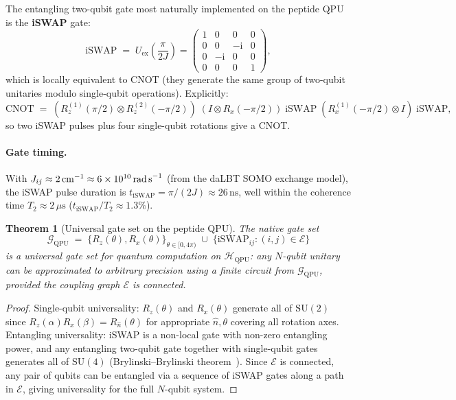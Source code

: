 \documentclass[11pt,oneside]{amsbook}
\numberwithin{equation}{section}
\theoremstyle{plain}
\newtheorem{theorem}{Theorem}[section]
\theoremstyle{definition}
\theoremstyle{remark}
\begin{document}
The entangling two-qubit gate most naturally implemented on the peptide QPU is
the \textbf{iSWAP} gate:
\begin{equation}
  \text{iSWAP} \;=\; U_{\text{ex}}\!\left(\frac{\pi}{2J}\right)
  = \begin{pmatrix} 1&0&0&0\\ 0&0&-\mathrm{i}&0\\ 0&-\mathrm{i}&0&0\\ 0&0&0&1 \end{pmatrix},
\label{eq:iSWAP}
\end{equation}
which is locally equivalent to CNOT (they generate the same group of two-qubit
unitaries modulo single-qubit operations).  Explicitly:
\begin{equation}
  \text{CNOT} \;=\;
  (R_z^{(1)}(\pi/2) \otimes R_z^{(2)}(-\pi/2))\;
  (I \otimes R_x(-\pi/2))\;
  \text{iSWAP}\;
  (R_x^{(1)}(-\pi/2) \otimes I)\;
  \text{iSWAP},
\label{eq:CNOT_from_iSWAP}
\end{equation}
so two iSWAP pulses plus four single-qubit rotations give a CNOT.

\paragraph{Gate timing.}  With $J_{ij} \approx 2\,\text{cm}^{-1}
\approx 6 \times 10^{10}\,\text{rad\,s}^{-1}$ (from the daLBT SOMO exchange
model), the iSWAP pulse duration is
$t_{\text{iSWAP}} = \pi / (2J) \approx 26\,\text{ns}$, well within the
coherence time $T_2 \approx 2\,\mu\text{s}$ ($t_{\text{iSWAP}}/T_2 \approx 1.3\%$).

\begin{theorem}[Universal gate set on the peptide QPU]
\label{thm:universality}
The native gate set
\[
  \mathcal{G}_{\text{QPU}} \;=\; \{R_z(\theta), R_x(\theta)\}_{\theta\in[0,4\pi)}
  \;\cup\; \{\mathrm{iSWAP}_{ij} : (i,j) \in \mathcal{E}\}
\]
is a \emph{universal} gate set for quantum computation on
$\mathcal{H}_{\text{QPU}}$: any $N$-qubit unitary can be approximated to
arbitrary precision using a finite circuit from $\mathcal{G}_{\text{QPU}}$,
provided the coupling graph $\mathcal{E}$ is connected.
\end{theorem}
\begin{proof}
Single-qubit universality: $R_z(\theta)$ and $R_x(\theta)$ generate all of
$\mathrm{SU}(2)$ since $R_z(\alpha)R_x(\beta) = R_{\hat{n}}(\theta)$ for
appropriate $\hat{n}, \theta$ covering all rotation axes.  Entangling
universality: iSWAP is a non-local gate with non-zero entangling power, and
any entangling two-qubit gate together with single-qubit gates generates all of
$\mathrm{SU}(4)$ (Brylinski--Brylinski theorem~\cite{BrylinskiBrylinski2002}).
Since $\mathcal{E}$ is connected, any pair of qubits can be entangled via a
sequence of iSWAP gates along a path in $\mathcal{E}$, giving universality for
the full $N$-qubit system.
\end{proof}
\end{document}

